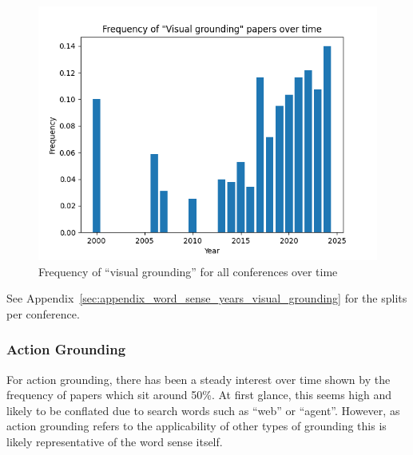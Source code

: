 \documentclass[11pt]{article}
\begin{document}
\begin{figure}[h!]
  \includegraphics[width=\columnwidth]{figs/freq_grounding_figs/Visual/all_confs_grounding_Visual.png}
  \caption{Frequency of ``visual grounding'' for all conferences over time}
  \label{fig:visual_all_confs_freq}
\end{figure}

See Appendix~\ref{sec:appendix_word_sense_years_visual_grounding} for the splits per conference.

\subsubsection{Action Grounding}
For action grounding, there has been a steady interest over time shown by the frequency of papers which sit around 50\%. At first glance, this seems high and likely to be conflated due to search words such as ``web'' or ``agent''. However, as action grounding refers to the applicability of other types of grounding this is likely representative of the word sense itself.
\end{document}
